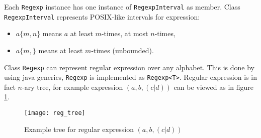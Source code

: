\documentclass[a4paper,10pt,oneside]{article}
\newcommand{\code}[1]{\texttt{#1}}
\begin{document}
Each \code{Regexp} instance has one instance of \code{RegexpInterval} as member.
Class \code{RegexpInterval} represents POSIX-like intervals for expression:
\begin{itemize}
	\item $a\{m,n\}$ means $a$ at least $m$-times, at most $n$-times,
	\item $a\{m,\}$ means at least $m$-times (unbounded).
\end{itemize}

Class \code{Regexp} can represent regular expression over any alphabet.
This is done by using java generics, \code{Regexp} is implemented as \code{Regexp<T>}.
Regular expression is in fact $n$-ary tree, for example expression $(a, b, (c | d))$ can be viewed as in figure \ref{reg:tree}.
\begin{figure}
\caption{Example tree for regular expression $(a, b, (c | d))$} \label{reg:tree}
\texttt{[image: reg\_tree]}
\end{figure}

\nocite{*}


\end{document}
